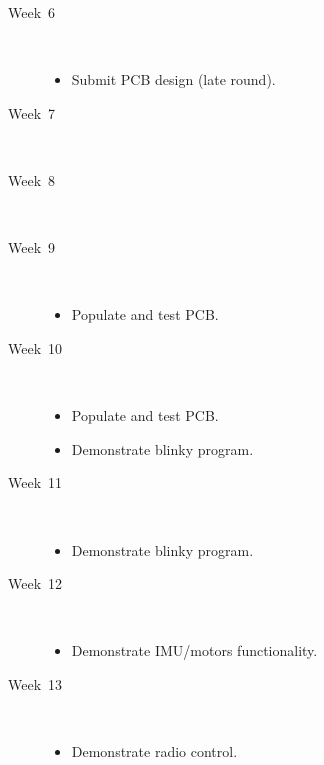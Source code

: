 \documentclass[11pt, a4paper]{article}
\begin{document}
\begin{description}
  
\item [Week~6]\mbox{}\\  
  
  \begin{itemize}
  \item Submit PCB design (late round).
  \end{itemize}
  
  
\item [Week~7]\mbox{}\\
  
  
\item [Week~8]\mbox{}\\  
  
\item [Week~9]\mbox{}\\
  
  \begin{itemize}
  \item Populate and test PCB.
  \end{itemize}  
  
  
\item [Week~10]\mbox{}\\

  \begin{itemize}
  \item Populate and test PCB.
  \item Demonstrate blinky program.
  \end{itemize}

\item [Week~11]\mbox{}\\  

  \begin{itemize}
  \item Demonstrate blinky program.
  \end{itemize}  
 
\item [Week~12]\mbox{}\\
  
  \begin{itemize}
  \item Demonstrate IMU/motors functionality.
  \end{itemize}
  
\item [Week~13]\mbox{}\\  
  
  \begin{itemize}
  \item Demonstrate radio control.
  \end{itemize}  
  

\end{description}
\end{document}
